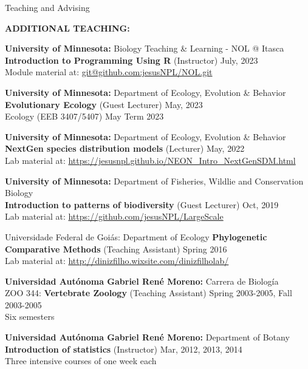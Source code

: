 \documentclass{resume} %
\begin{document}
\begin{rSection}{Teaching and Advising}

\textbf{ADDITIONAL TEACHING:}

{\bf University of Minnesota: }{Biology Teaching \& Learning - NOL @ Itasca} \\
\textbf{Introduction to Programming Using R} (Instructor) \hfill July, 2023 \\
{Module material at:
\url{git@github.com:jesusNPL/NOL.git}}\smallskip 

{\bf University of Minnesota: }{Department of Ecology, Evolution \& Behavior } \\
\textbf{Evolutionary Ecology} (Guest Lecturer) \hfill May, 2023 \\
{Ecology (EEB 3407/5407) May Term 2023}\smallskip 

{\bf University of Minnesota: }{Department of Ecology, Evolution \& Behavior } \\
\textbf{NextGen species distribution models} (Lecturer) \hfill May, 2022 \\
{Lab material at:
\url{https://jesusnpl.github.io/NEON_Intro_NextGenSDM.html}}\smallskip 

{\bf University of Minnesota: }{Department of Fisheries, Wildlie and Conservation Biology } \\
\textbf{Introduction to patterns of biodiversity} (Guest Lecturer) \hfill Oct, 2019 \\
{Lab material at:
\url{https://github.com/jesusNPL/LargeScale}}\smallskip 

\begin{reSubsection}{Universidade Federal de Goiás: }{Department of Ecology }{}{
\textbf{Phylogenetic Comparative Methods} (Teaching Assistant) \hfill Spring 2016 \\ 
{Lab material at:
\url{http://dinizfilho.wixsite.com/dinizfilholab/}} \smallskip 
} 
\end{reSubsection}

{\bf Universidad Autónoma Gabriel René Moreno: }{Carrera de Biología } \\
ZOO 344: \textbf{Vertebrate Zoology} (Teaching Assistant) \hfill Spring 2003-2005, Fall 2003-2005 \\
{Six semesters}\smallskip 

{\bf Universidad Autónoma Gabriel René Moreno: }{Department of Botany } \\
\textbf{Introduction of statistics} (Instructor) \hfill Mar, 2012, 2013, 2014 \\
{Three intensive courses of one week each}\smallskip 


\end{rSection}
\end{document}
